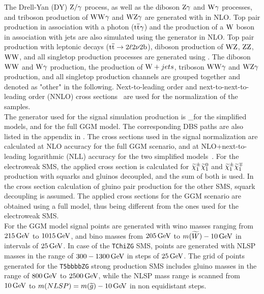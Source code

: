 The Drell-Yan (DY) $\mathrm{Z}/\gamma$ process, as well as the diboson $\mathrm{Z}\gamma$ and $\mathrm{W}\gamma$ processes, and triboson production of $\mathrm{W}\mathrm{W}\gamma$ and $\mathrm{W}\mathrm{Z}\gamma$ are generated with \MADANDMC in NLO. Top pair production in association with a photon (${\mathrm{t}\overline{\mathrm{t}}}\gamma$) and the production of a $\mathrm{W}$ boson in association with jets are also simulated using the \MADANDMC generator in NLO. Top pair production with leptonic decays (${\mathrm{t}\overline{\mathrm{t}}}\to 2\ell 2\nu 2\mathrm{b}$), diboson production of $\mathrm{W}\mathrm{Z}$, $\mathrm{Z}\mathrm{Z}$, $\mathrm{W}\mathrm{W}$, and all singletop production processes are generated using \POWHEG.
The diboson $\mathrm{W}\mathrm{W}$ and $\mathrm{W}\gamma$ production, the production of $\mathrm{W}+jets$, triboson $\mathrm{W}\mathrm{W}\gamma$ and $\mathrm{W}\mathrm{Z}\gamma$ production, and all singletop production channels are grouped together and denoted as "other" in the following.
Next-to-leading order and next-to-next-to-leading order (NNLO) cross sections~\cite{xsec1,xsec2,xsec3,xsec4,xsec5,xsec6,xsec7,xsec8,xsec9} are used for the normalization of the samples.\\
The generator used for the signal simulation production is \MADGRAPH\_\MCATNLO for the simplified models, and  for the full GGM model. The corresponding DBS paths are also listed in the appendix in .
The cross sections used in the signal normalization are calculated at NLO accuracy for the full GGM scenario, and at NLO+next-to-leading logarithmic (NLL) accuracy for the two simplified models~\cite{sxsec1,sxsec2,sxsec3,sxsec4,sxsec5,sxsec6,sxsec7,sxsec8,sxsec9}.
For the electroweak SMS, the applied cross section is calculated for $\widetilde{\chi}^\pm_{1}\widetilde{\chi}^{0}_{1}$ and $\widetilde{\chi}^\pm_{1}\widetilde{\chi}^\mp_{1}$ production with squarks and gluinos decoupled, and the sum of both is used. In the cross section calculation of gluino pair production for the other SMS, squark decoupling is assumed. The applied cross sections for the GGM scenario are obtained using a full model, thus being different from the ones used for the electroweak SMS.\\
For the GGM model signal points are generated with wino masses ranging from $215\,\text{Ge\hspace{-.08em}V}$ to $1015\,\text{Ge\hspace{-.08em}V}$, and bino masses from $205\,\text{Ge\hspace{-.08em}V}$ to $m(\widetilde{W})-10\,\text{Ge\hspace{-.08em}V}$ in intervals of $25\,\text{Ge\hspace{-.08em}V}$.
In case of the \texttt{TChiZG} SMS, points are generated with NLSP masses in the range of $300-1300\,\text{Ge\hspace{-.08em}V}$ in steps of $25\,\text{Ge\hspace{-.08em}V}$. The grid of points generated for the \texttt{T5bbbbZG} strong production SMS includes gluino masses in the range of $800\,\text{Ge\hspace{-.08em}V}$ to $2500\,\text{Ge\hspace{-.08em}V}$, while the NLSP mass range is scanned from $10\,\text{Ge\hspace{-.08em}V}$ to $m(NLSP)=m(\widetilde{g})-10\,\text{Ge\hspace{-.08em}V}$ in non equidistant steps.\\
